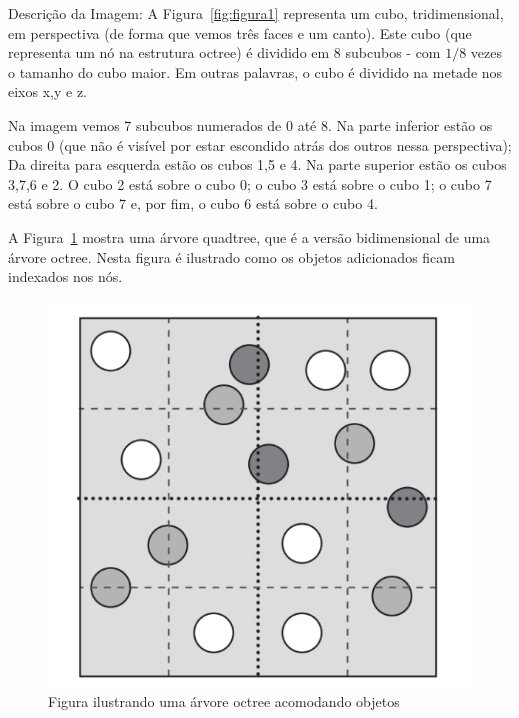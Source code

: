 \begin{framed}
\footnotesize
\noindent Descrição da Imagem: A Figura~\ref{fig:figura1} representa um cubo, tridimensional, em perspectiva (de forma que vemos três faces e um canto). Este cubo (que representa um nó na estrutura octree) é dividido em 8 subcubos - com $1/8$ vezes o tamanho do cubo maior. Em outras palavras, o cubo é dividido na metade nos eixos x,y e z.

\noindent Na imagem vemos 7 subcubos numerados de 0 até 8. Na parte inferior estão os cubos 0 (que não é visível por estar escondido atrás dos outros nessa perspectiva); Da direita para esquerda estão os cubos 1,5 e 4. Na parte superior estão os cubos 3,7,6 e 2. O cubo 2 está sobre o cubo 0; o cubo 3 está sobre o cubo 1; o cubo 7 está sobre o cubo 7 e, por fim, o cubo 6 está sobre o cubo 4.
\end{framed}

A Figura~\ref{fig:figura2} mostra uma árvore quadtree, que é a versão bidimensional de uma árvore octree. Nesta figura é ilustrado como os objetos adicionados ficam indexados nos nós.

\begin{figure}[htb]
  \centering
	\caption{\label{fig:figura2} Figura ilustrando uma árvore octree acomodando objetos}
	\includegraphics[scale=0.5]{Imagens/Figura_7.11.png} %
\end{figure}

